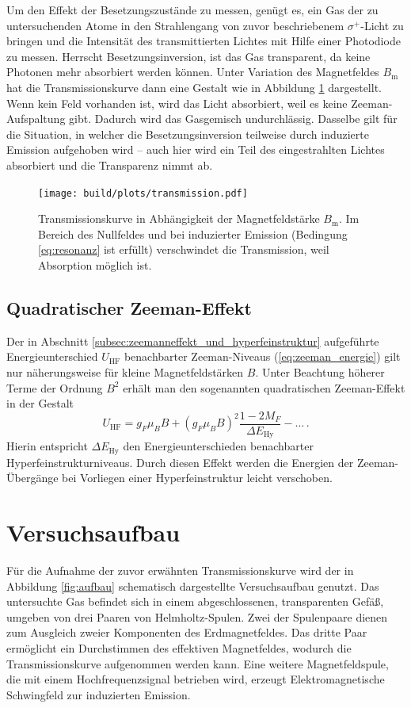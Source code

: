 Um den Effekt der Besetzungszustände zu messen, genügt es, ein Gas der zu
untersuchenden Atome in den Strahlengang von zuvor beschriebenem
$\sigma^+$-Licht zu bringen und die Intensität des transmittierten Lichtes mit
Hilfe einer Photodiode zu messen. Herrscht Besetzungsinversion, ist das Gas
transparent, da keine Photonen mehr absorbiert werden können. Unter Variation
des Magnetfeldes $B_\text{m}$ hat die Transmissionskurve dann eine Gestalt wie
in Abbildung \ref{fig:transmission} dargestellt.
Wenn kein Feld vorhanden ist, wird das Licht absorbiert, weil es keine
Zeeman-Aufspaltung gibt. Dadurch wird das Gasgemisch undurchlässig.
Dasselbe gilt für die Situation, in welcher die Besetzungsinversion teilweise
durch induzierte Emission aufgehoben wird -- auch hier wird ein Teil des
eingestrahlten Lichtes absorbiert und die Transparenz nimmt ab.
\begin{figure}
    \centering
    \texttt{[image: build/plots/transmission.pdf]}
    \caption{
        Transmissionskurve in Abhängigkeit der Magnetfeldstärke $B_\text{m}$.
        Im Bereich des Nullfeldes und bei induzierter Emission (Bedingung
        \ref{eq:resonanz} ist erfüllt) verschwindet die Transmission, weil
        Absorption möglich ist.
    }
    \label{fig:transmission}
\end{figure}

\subsection{Quadratischer Zeeman-Effekt}
\label{subsec:quadratischer_zeeman-effekt}
Der in Abschnitt \ref{subsec:zeemanneffekt_und_hyperfeinstruktur}
aufgeführte Energieunterschied $U_\text{HF}$ benachbarter Zeeman-Niveaus
(\ref{eq:zeeman_energie}) gilt nur näherungsweise für kleine Magnetfeldstärken
$B$. Unter Beachtung höherer Terme der Ordnung $B^2$ erhält man den sogenannten
quadratischen Zeeman-Effekt in der Gestalt
\begin{equation}
\label{eq:quadratischer_zeeman}
    U_\text{HF} = g_F \mu_B B
        + (g_F\mu_B B)^2 \frac{1 - 2M_F}{\Delta E_\text{Hy}} - \dots\,.
\end{equation}
Hierin entspricht $\Delta E_\text{Hy}$ den Energieunterschieden benachbarter
Hyperfeinstrukturniveaus. Durch diesen Effekt werden die Energien der
Zeeman-Übergänge bei Vorliegen einer Hyperfeinstruktur leicht verschoben.

\section{Versuchsaufbau}
\label{sec:versuchsaufbau}
Für die Aufnahme der zuvor erwähnten Transmissionskurve wird der in Abbildung
\ref{fig:aufbau} schematisch dargestellte Versuchsaufbau genutzt. Das
untersuchte Gas befindet sich in einem abgeschlossenen, transparenten Gefäß,
umgeben von drei Paaren von Helmholtz-Spulen. Zwei der Spulenpaare dienen zum
Ausgleich zweier Komponenten des Erdmagnetfeldes. Das dritte Paar ermöglicht ein
Durchstimmen des effektiven Magnetfeldes, wodurch die Transmissionskurve
aufgenommen werden kann.
Eine weitere Magnetfeldspule, die mit einem Hochfrequenzsignal betrieben wird,
erzeugt Elektromagnetische Schwingfeld zur induzierten Emission.

